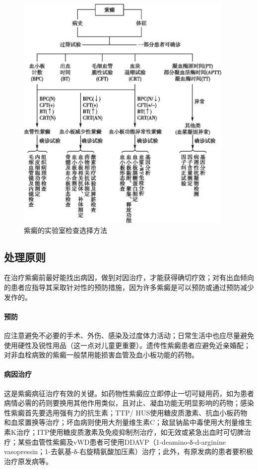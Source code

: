 \begin{figure}[!htbp]
 \centering
 \includegraphics[width=4.14583in,height=4.60417in]{./images/Image00061.jpg}
 \captionsetup{justification=centering}
 \caption{紫癜的实验室检查选择方法}
 \label{fig14-1}
  \end{figure} 

\subsection{处理原则}

在治疗紫癜前最好能找出病因，做到对因治疗，才能获得确切疗效；对有出血倾向的患者应指导其采取针对性的预防措施，因为许多紫癜是可以预防或通过预防减少发作的。

\paragraph{预防}

应注意避免不必要的手术、外伤、感染及过度体力活动；日常生活中也应尽量避免使用硬性及锐性用品（这一点对儿童更重要）。遗传性紫癜患者应避免近亲婚配；对非血栓病致的紫癜一般禁用能损害血管及血小板功能的药物。

\paragraph{病因治疗}

这是紫癜病征治疗有效的关键。如药物性紫癜应立即停止一切可疑用药，如为患者病情必需的药则要换用其他作用类似，且对止、凝血功能无明显影响的药物；感染性紫癜首先要选用强有力的抗生素；TTP/
HUS使用糖皮质激素、抗血小板药物和血浆置换等治疗；坏血病则使用大剂量维生素C；敌鼠钠盐中毒使用大剂量维生素K治疗；ITP使用糖皮质激素及免疫抑制剂治疗，如无效或紧急出血时可切脾治疗；某些血管性紫癜及vWD患者可使用DDAVP（1-deamino-δ-d-arginine
vasopressin；1-去氨基-δ-右旋精氨酸加压素）治疗；此外，有原发病的患者要积极治疗原发病等。

